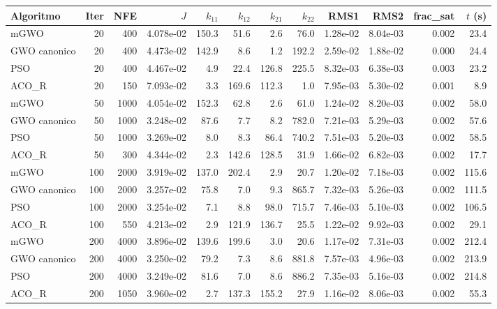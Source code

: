 \begin{tabular}{lrrrrrrrrrrr}
\hline
Algoritmo & Iter & NFE & $J$ & $k_{11}$ & $k_{12}$ & $k_{21}$ & $k_{22}$ & RMS1 & RMS2 & frac\_sat & $t$ (s) \\
\hline
mGWO & 20 & 400 & 4.078e-02 & 150.3 & 51.6 & 2.6 & 76.0 & 1.28e-02 & 8.04e-03 & 0.002 & 23.4 \\
GWO canonico & 20 & 400 & 4.473e-02 & 142.9 & 8.6 & 1.2 & 192.2 & 2.59e-02 & 1.88e-02 & 0.000 & 24.4 \\
PSO & 20 & 400 & 4.467e-02 & 4.9 & 22.4 & 126.8 & 225.5 & 8.32e-03 & 6.38e-03 & 0.003 & 23.2 \\
ACO\_R & 20 & 150 & 7.093e-02 & 3.3 & 169.6 & 112.3 & 1.0 & 7.95e-03 & 5.30e-02 & 0.001 & 8.9 \\
mGWO & 50 & 1000 & 4.054e-02 & 152.3 & 62.8 & 2.6 & 61.0 & 1.24e-02 & 8.20e-03 & 0.002 & 58.0 \\
GWO canonico & 50 & 1000 & 3.248e-02 & 87.6 & 7.7 & 8.2 & 782.0 & 7.21e-03 & 5.29e-03 & 0.002 & 57.6 \\
PSO & 50 & 1000 & 3.269e-02 & 8.0 & 8.3 & 86.4 & 740.2 & 7.51e-03 & 5.20e-03 & 0.002 & 58.5 \\
ACO\_R & 50 & 300 & 4.344e-02 & 2.3 & 142.6 & 128.5 & 31.9 & 1.66e-02 & 6.82e-03 & 0.002 & 17.7 \\
mGWO & 100 & 2000 & 3.919e-02 & 137.0 & 202.4 & 2.9 & 20.7 & 1.20e-02 & 7.18e-03 & 0.002 & 115.6 \\
GWO canonico & 100 & 2000 & 3.257e-02 & 75.8 & 7.0 & 9.3 & 865.7 & 7.32e-03 & 5.26e-03 & 0.002 & 111.5 \\
PSO & 100 & 2000 & 3.254e-02 & 7.1 & 8.8 & 98.0 & 715.7 & 7.46e-03 & 5.10e-03 & 0.002 & 106.5 \\
ACO\_R & 100 & 550 & 4.213e-02 & 2.9 & 121.9 & 136.7 & 25.5 & 1.22e-02 & 9.92e-03 & 0.002 & 29.1 \\
mGWO & 200 & 4000 & 3.896e-02 & 139.6 & 199.6 & 3.0 & 20.6 & 1.17e-02 & 7.31e-03 & 0.002 & 212.4 \\
GWO canonico & 200 & 4000 & 3.250e-02 & 79.2 & 7.3 & 8.6 & 881.8 & 7.57e-03 & 4.96e-03 & 0.002 & 213.9 \\
PSO & 200 & 4000 & 3.249e-02 & 81.6 & 7.0 & 8.6 & 886.2 & 7.35e-03 & 5.16e-03 & 0.002 & 214.8 \\
ACO\_R & 200 & 1050 & 3.960e-02 & 2.7 & 137.3 & 155.2 & 27.9 & 1.16e-02 & 8.06e-03 & 0.002 & 55.3 \\
\hline
\end{tabular}
